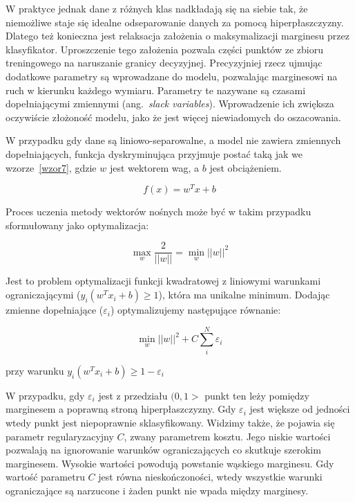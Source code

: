 \documentclass[12pt,a4paper,twoside,openany]{book}
\begin{document}
W praktyce jednak dane z różnych klas nadkładają się na siebie tak, że niemożliwe staje się idealne odseparowanie danych za pomocą hiperpłaszczyzny. Dlatego też konieczna jest relaksacja założenia o maksymalizacji marginesu przez klasyfikator. Uproszczenie tego założenia pozwala części punktów ze zbioru treningowego na naruszanie granicy decyzyjnej. Precyzyjniej rzecz ujmując dodatkowe parametry są wprowadzane do modelu, pozwalając marginesowi na ruch w kierunku każdego wymiaru. Parametry te nazywane są czasami dopełniającymi zmiennymi (ang.~\textit{slack variables}). Wprowadzenie ich zwiększa oczywiście złożoność modelu, jako że jest więcej niewiadomych do oszacowania. 

W przypadku gdy dane są liniowo-separowalne, a model nie zawiera zmiennych dopełniających, funkcja dyskryminująca przyjmuje postać taką jak we wzorze~\ref{wzor7}, gdzie $w$ jest wektorem wag, a $b$ jest obciążeniem.

\begin{equation} \label{wzor7}
f(x) = w^Tx + b
\end{equation}

Proces uczenia metody wektorów nośnych może być w takim przypadku sformułowany jako optymalizacja:

\begin{equation} \label{wzor8}
\max_w \frac{2}{||w||} = \min_w ||w||^2
\end{equation}

Jest to problem optymalizacji funkcji kwadratowej z liniowymi warunkami ograniczającymi ($y_i(w^Tx_i + b) \geq 1$), która ma unikalne minimum. Dodając zmienne dopełniające ($\varepsilon_i$) optymalizujemy następujące równanie:

\begin{equation} \label{wzor9}
\min_w ||w||^2 + C\sum_{i}^{N} \varepsilon_i
\end{equation}

przy warunku $y_i(w^Tx_i + b) \geq 1 - \varepsilon_i$

W przypadku, gdy $\varepsilon_i$ jest z przedziału $(0,1>$ punkt ten leży pomiędzy marginesem a poprawną stroną hiperpłaszczyzny. Gdy $\varepsilon_i$ jest większe od jedności wtedy punkt jest niepoprawnie sklasyfikowany. Widzimy także, że pojawia się parametr regularyzacyjny $C$, zwany parametrem kosztu. Jego niskie wartości pozwalają na ignorowanie warunków ograniczających co skutkuje szerokim marginesem. Wysokie wartości powodują powstanie wąskiego marginesu. Gdy wartość parametru $C$ jest równa nieskończoności, wtedy wszystkie warunki ograniczające są narzucone i żaden punkt nie wpada między marginesy. 
\end{document}
